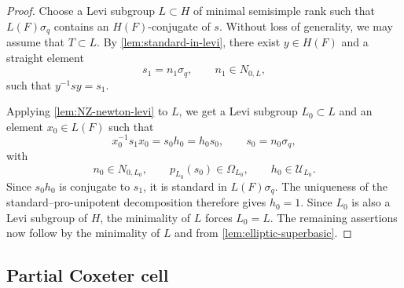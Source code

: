 \documentclass[11pt]{amsart}
\numberwithin{equation}{section}
\theoremstyle{definition}
\theoremstyle{remark}
\begin{document}
\begin{proof}
Choose a Levi subgroup $L\subset H$ of minimal semisimple rank such that $L(F)\sigma_q$ contains an $H(F)$-conjugate of $s$. Without loss of generality, we may assume that
$T\subset L$. By \cref{lem:standard-in-levi}, there exist
$y\in H(F)$ and a straight element
\[
  s_1=n_1\sigma_q,\qquad n_1\in N_{0,L},
\]
such that $y^{-1}sy=s_1$.

Applying \cref{lem:NZ-newton-levi} to $L$,
we get a Levi subgroup
$L_0\subset L$ and an element $x_0\in L(F)$ such that
\[
  x_0^{-1}s_1x_0=s_0h_0=h_0s_0,
  \qquad
  s_0=n_0\sigma_q,
\]
with
\[
  n_0\in N_{0,L_0},\qquad p_{L_0}(s_0)\in\Omega_{L_0},
  \qquad h_0\in \mathcal{U}_{L_0}.
\]
Since $s_0h_0$ is conjugate to $s_1$, it is standard in
$L(F)\sigma_q$. The uniqueness of the standard--pro-unipotent
decomposition \cite[Theorem~1.1(a)]{NZ} therefore gives $h_0=1$.
Since $L_0$ is also a Levi subgroup of $H$, the minimality of $L$ forces $L_0=L$. The remaining assertions now follow by the minimality of $L$ and from \cref{lem:elliptic-superbasic}.
\end{proof}

\subsection{Partial Coxeter cell}
\end{document}
